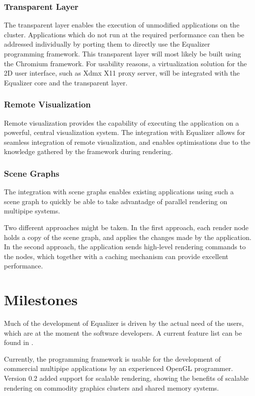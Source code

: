 \documentclass[10pt,a4paper]{scrartcl}
\begin{document}
\subsubsection{Transparent Layer}
The transparent layer enables the execution of unmodified applications
on the cluster. Applications which do not run at the required
performance can then be addressed individually by porting them to
directly use the Equalizer programming framework. This transparent layer
will most likely be built using the Chromium\cite{Humphreys02}
framework. For usability reasons, a virtualization solution for the 2D
user interface, such as Xdmx X11 proxy server, will be integrated with
the Equalizer core and the transparent layer.

\subsubsection{Remote Visualization}
Remote visualization provides the capability of executing the
application on a powerful, central visualization system. The integration
with Equalizer allows for seamless integration of remote visualization,
and enables optimisations due to the knowledge gathered by the framework
during rendering.

\subsubsection{Scene Graphs}
The integration with scene graphs enables existing applications using
such a scene graph to quickly be able to take advantadge of parallel
rendering on multipipe systems.

Two different approaches might be taken. In the first approach, each
render node holds a copy of the scene graph, and applies the changes
made by the application. In the second approach, the application sends
high-level rendering commands to the nodes, which together with a
caching mechanism can provide excellent performance.

\section{Milestones}

Much of the development of Equalizer is driven by the actual need of the
users, which are at the moment the software developers. A current
feature list can be found in \cite{Features}.

Currently, the programming framework is usable for the development of
commercial multipipe applications by an experienced OpenGL
programmer. Version 0.2 added support for scalable rendering, showing
the benefits of scalable rendering on commodity graphics clusters and
shared memory systems.
\end{document}
